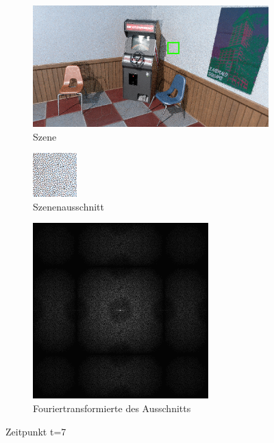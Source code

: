 \begin{figure}[H]
    \begin{subfigure}{\textwidth}   
        \centering \includegraphics[scale=.25]{content/TemporalerAlg/Bilder/Retargeting/Szene/Szene7.png}
        \caption{Szene}
        \label{fig:Retargeting_And_Sorting_Szene_t7}
    \end{subfigure}
    \begin{subfigure}{0.5\textwidth}
        \centering\includegraphics[width=0.4\linewidth]{content/TemporalerAlg/Bilder/Retargeting/Ausschnitt/Ausschnitt7.png} 
        \caption{Szenenausschnitt}
        \label{fig:Retargeting_And_Sorting_ausschnitt_t7}
    \end{subfigure}
    \begin{subfigure}{0.5\textwidth}
        \centering\includegraphics[width=0.4\linewidth]{content/TemporalerAlg/Bilder/Retargeting/Spektren/Ausschnitt7.png}
        \caption{Fouriertransformierte des Ausschnitts}
        \label{fig:Retargeting_And_Sorting_Fouriertransformierte_t7}
    \end{subfigure}
        \caption{Zeitpunkt t=7}
        \label{fig:Retargeting_And_Sorting_Verlauf_t7}
\end{figure}


